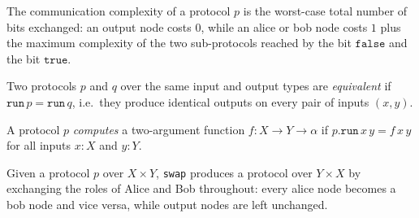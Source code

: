 \begin{definition}
\label{CommunicationComplexity.Deterministic.Protocol.complexity}
\leanok
{}
The communication complexity of a protocol $p$ is the worst-case total number of bits
exchanged: an output node costs $0$, while an alice or bob node costs $1$ plus the
maximum complexity of the two sub-protocols reached by the bit $\mathtt{false}$ and the
bit $\mathtt{true}$.
\end{definition}

\begin{definition}
\label{CommunicationComplexity.Deterministic.Protocol.Equiv}
\leanok
{}
Two protocols $p$ and $q$ over the same input and output types are \emph{equivalent} if
$\texttt{run}\,p = \texttt{run}\,q$, i.e.\ they produce identical outputs on every pair of
inputs $(x, y)$.
\end{definition}

\begin{definition}
\label{CommunicationComplexity.Deterministic.Protocol.Computes}
\leanok
{}
A protocol $p$ \emph{computes} a two-argument function $f : X \to Y \to \alpha$ if
$p.\texttt{run}\,x\,y = f\,x\,y$ for all inputs $x : X$ and $y : Y$.
\end{definition}

\begin{definition}
\label{CommunicationComplexity.Deterministic.Protocol.swap}
\leanok
{}
Given a protocol $p$ over $X \times Y$, \texttt{swap} produces a protocol over $Y \times X$
by exchanging the roles of Alice and Bob throughout: every alice node becomes a bob node
and vice versa, while output nodes are left unchanged.
\end{definition}

